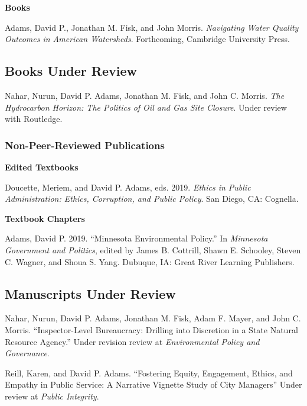 \documentclass[12pt,letterpaper]{article}
\renewenvironment{itemize}{
  \begin{list}{}{
    \setlength{\leftmargin}{1.5em}
    \setlength{\itemsep}{0.25em}
    \setlength{\parskip}{0pt}
    \setlength{\parsep}{0.25em}
  }
}{
  \end{list}
}
\begin{document}
\textbf{Books}
\begin{itemize}\leftmargin=2pt\itemindent=-15pt
  \item Adams, David P., Jonathan M. Fisk, and John Morris. \emph{Navigating Water Quality Outcomes in American Watersheds}. Forthcoming, Cambridge University Press.
\end{itemize}

\subsection*{Books Under Review}

\begin{itemize}\leftmargin=2pt\itemindent=-15pt
  \item Nahar, Nurun, David P. Adams, Jonathan M. Fisk, and John C. Morris. \emph{The Hydrocarbon Horizon: The Politics of Oil and Gas Site Closure}. Under review with Routledge.
\end{itemize}

\subsubsection*{Non-Peer-Reviewed Publications}

\textbf{Edited Textbooks}
\begin{itemize}\leftmargin=2pt\itemindent=-15pt
    \item Doucette, Meriem, and David P. Adams, eds. 2019. \emph{Ethics in Public Administration: Ethics, Corruption, and Public Policy}. San Diego, CA: Cognella.
\end{itemize}

\textbf{Textbook Chapters}
\begin{itemize}\leftmargin=2pt\itemindent=-15pt
    \item Adams, David P. 2019. ``Minnesota Environmental Policy.'' In \emph{Minnesota Government and Politics}, edited by James B. Cottrill, Shawn E. Schooley, Steven C. Wagner, and Shoua S. Yang. Dubuque, IA: Great River Learning Publishers.
\end{itemize}

\subsection*{Manuscripts Under Review}
\begin{itemize}\leftmargin=2pt\itemindent=-15pt\leftmargin=2pt\itemindent=-15pt
  
    \item Nahar, Nurun, David P. Adams, Jonathan M. Fisk, Adam F. Mayer, and John C. Morris. ``Inspector-Level Bureaucracy: Drilling into Discretion in a State Natural Resource Agency.'' Under revision review at \emph{Environmental Policy and Governance}.

    \item Reill, Karen, and David P. Adams. ``Fostering Equity, Engagement, Ethics, and Empathy in Public Service: A Narrative Vignette Study of City Managers'' Under review at \emph{Public Integrity}.
\end{itemize}
\end{document}
